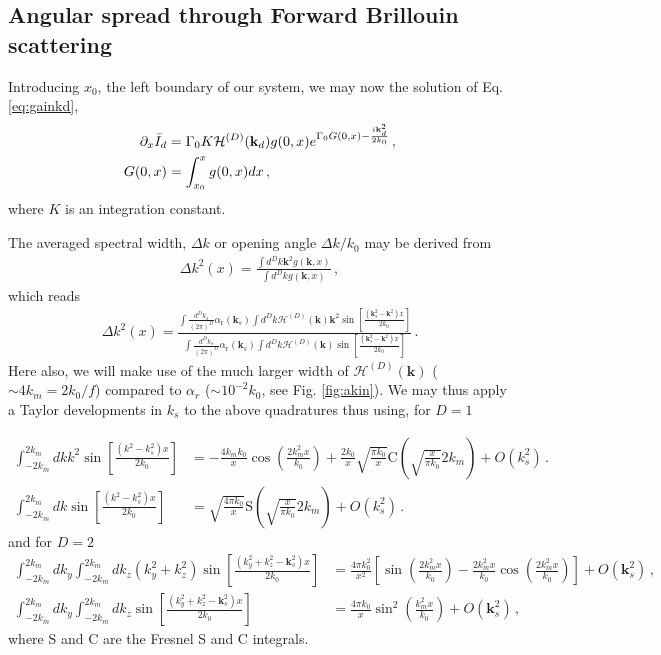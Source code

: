 \documentclass[
 reprint,
 amsmath,amssymb,
 aps,
]{revtex4-1}
\begin{document}
\subsection{Angular spread through Forward Brillouin scattering}

Introducing $x_0$, the left boundary of our system, we may now the solution of Eq. \eqref{eq:gainkd}, 
\begin{align}
\partial_x\Bar{I}_d &=\Gamma_0 K  \mathcal{H}^{(D)}(\mathbf{k}_d) g(0,x)
e^{\Gamma_0 G(0,x)-\frac{i\mathbf{k}_d^2 }{2k_0}} \, ,\nonumber\\
G(0,x)&=\int_{x_0}^{x}g(0,x) dx \, , \label{eq:dxidkd}
\end{align}
where $K$ is an integration constant. 

The averaged spectral width, $\Delta k$ or opening angle $\Delta k/k_0 $ may be derived from  
 \begin{align}
 \Delta k ^2(x) = \frac{\int  d^Dk \mathbf{k}^2 g(\mathbf{k},x )}{\int  d^Dk  g(\mathbf{k},x )}\, ,
\end{align}
which reads 
 \begin{align}
 \Delta k ^2(x) = \frac{
  \int \frac{d^Dk_s}{(2\pi)^D}  \alpha_\mathrm{r}(\mathbf{k}_s) 
 \int  d^Dk \mathcal{H}^{(D)}(\mathbf{k})\mathbf{k}^2 \sin\left[ \frac{(\mathbf{k}_s^2-\mathbf{k}^2)x}{2k_0}\right]
 }{
  \int \frac{d^Dk_s}{(2\pi)^D}  \alpha_\mathrm{r}(\mathbf{k}_s) 
\int  d^Dk\mathcal{H}^{(D)}(\mathbf{k})\sin\left[ \frac{(\mathbf{k}_s^2-\mathbf{k}^2)x}{2k_0}\right]
 }\, .
\end{align}
Here also, we will make use of the much larger width of $\mathcal{H}^{(D)}(\mathbf{k})$ ($\sim 4k_m = 2k_0/f$) compared to $\alpha_r$ ($\sim 10^{-2}k_0$, see Fig. \ref{fig:akin}).
We may thus apply a Taylor developments in $k_s$ to  the above quadratures thus using, for $D=1$
 \begin{widetext}
\begin{align}
 \int_{-2k_m}^{2k_m}  dk  k^2 \sin\left[ \frac{ (k^2-k_s^2)x}{2k_0}\right] &= -\frac{4k_mk_0}{x}\cos\left(\frac{ 2k_m^2x}{k_0}\right) + \frac{2k_0}{x} \sqrt{\frac{\pi k_0}{x}} \mathrm{C}\left( \sqrt{\frac{x}{\pi k_0}}  2k_m \right)
 + O(k_s^2)\, . \\ 
 \int_{-2k_m}^{2k_m}  dk  \sin\left[ \frac{ (k^2-k_s^2)x}{2k_0}\right] &= 
 \sqrt{\frac{4\pi k_0}{x}} \mathrm{S}\left( \sqrt{\frac{x}{\pi k_0}}  2k_m \right)
  + O(k_s^2)\, . 
\end{align}
and for $D=2$
\begin{align}
 \int_{-2k_m}^{2k_m}  dk_y  \int_{-2k_m}^{2k_m}  dk_z  (k_y^2+k_z^2) \sin\left[ \frac{(k_y^2+k_z^2 -\mathbf{k}_s^2) x}{2k_0}\right]& =  
 \frac{4\pi k_0^2}{x^2} \left[ \sin\left( \frac{ 2k_m^2 x}{k_0} \right) -\frac{ 2k_m^2x}{k_0}\cos\left( \frac{ 2k_m^2x}{k_0}\right) \right]
 + O(\mathbf{k}_s^2)\, , \\
 \int_{-2k_m}^{2k_m}  dk_y  \int_{-2k_m}^{2k_m}  dk_z  \sin\left[ \frac{(k_y^2+k_z^2 -\mathbf{k}_s^2) x}{2k_0}\right] &= 
 \frac{4\pi k_0}{x}\sin^2 \left( \frac{ k_m^2x}{k_0}\right)
  + O(\mathbf{k}_s^2)\, ,
\end{align}
 where $\mathrm{S}$ and $\mathrm{C}$ are the Fresnel S and C integrals. 
 \end{widetext}
 
\end{document}
